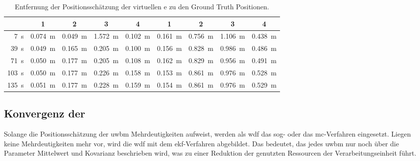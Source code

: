 \begin{table}
	\centering
	\begin{tabular}{||r||c|c|c|c||c|c|c|c||}
		\hline
 & 1 & 2 & 3 & 4 & 1 & 2 & 3 & 4 \\
\hline
\SI{7}{\second} & \SI{0.074}{\meter} & \SI{0.049}{\meter} & \SI{1.572}{\meter} & \SI{0.102}{\meter} & \SI{0.161}{\meter} & \SI{0.756}{\meter} & \SI{1.106}{\meter} & \SI{0.438}{\meter} \\
\SI{39}{\second} & \SI{0.049}{\meter} & \SI{0.165}{\meter} & \SI{0.205}{\meter} & \SI{0.100}{\meter} & \SI{0.156}{\meter} & \SI{0.828}{\meter} & \SI{0.986}{\meter} & \SI{0.486}{\meter} \\
\SI{71}{\second} & \SI{0.050}{\meter} & \SI{0.177}{\meter} & \SI{0.205}{\meter} & \SI{0.108}{\meter} & \SI{0.162}{\meter} & \SI{0.829}{\meter} & \SI{0.956}{\meter} & \SI{0.491}{\meter} \\
\SI{103}{\second} & \SI{0.050}{\meter} & \SI{0.177}{\meter} & \SI{0.226}{\meter} & \SI{0.158}{\meter} & \SI{0.153}{\meter} & \SI{0.861}{\meter} & \SI{0.976}{\meter} & \SI{0.528}{\meter} \\
\SI{135}{\second} & \SI{0.051}{\meter} & \SI{0.177}{\meter} & \SI{0.228}{\meter} & \SI{0.159}{\meter} & \SI{0.154}{\meter} & \SI{0.861}{\meter} & \SI{0.976}{\meter} & \SI{0.529}{\meter} \\
\hline
	\end{tabular}
	\caption{Entfernung der Positionsschätzung der virtuellen e zu den Ground Truth Positionen.}
	\label{tab:distance_between_virtual_uwb_and_gt}
\end{table}


%
%
\subsection{Konvergenz der }

Solange die Positionsschätzung der \gls{uwbm} Mehrdeutigkeiten aufweist, werden als \gls{wdf} das \gls{sog}- oder das \gls{mc}-Verfahren eingesetzt. Liegen keine Mehrdeutigkeiten mehr vor, wird die \gls{wdf} mit dem \gls{ekf}-Verfahren abgebildet. Das bedeutet, das jedes \gls{uwbm} nur noch über die Parameter Mittelwert und Kovarianz beschrieben wird, was zu einer Reduktion der genutzten Ressourcen der Verarbeitungseinheit führt.

